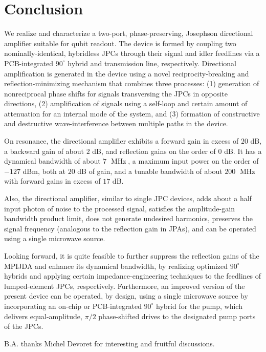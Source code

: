 \documentclass[aip,onecolumn,10pt]{revtex4}%
\begin{document}
\section{Conclusion}

We realize and characterize a two-port, phase-preserving, Josephson directional amplifier suitable for qubit readout. The device is formed by coupling two nominally-identical, hybridless JPCs through their signal and idler feedlines via a PCB-integrated $90^{\circ}$ hybrid and transmission line, respectively. Directional amplification is generated in the device using a novel reciprocity-breaking and reflection-minimizing mechanism that combines three processes: (1) generation of nonreciprocal phase shifts for signals transversing the JPCs in opposite directions, (2) amplification of signals using a self-loop and certain amount of attenuation for an internal mode of the system, and (3) formation of constructive and destructive wave-interference between multiple paths in the device.

On resonance, the directional amplifier exhibits a forward gain in excess of $20$ dB, a backward gain of about $2$ dB, and reflection gains on the order of $0$ dB. It has a dynamical bandwidth of about $7$ $\operatorname{MHz}$, a maximum input power on the order of $-127$ dBm, both at $20$ dB of gain, and a tunable bandwidth of about $200$ $\operatorname{MHz}$ with forward gains in excess of $17$ dB. 

Also, the directional amplifier, similar to single JPC devices, adds about a half input photon of noise to the processed signal, satisfies the amplitude-gain bandwidth product limit, does not generate undesired harmonics, preserves the signal frequency (analogous to the reflection gain in JPAs), and can be operated using a single microwave source.   

Looking forward, it is quite feasible to further suppress the reflection gains of the MPIJDA and enhance its dynamical bandwidth, by realizing optimized $90^{\circ}$ hybrids and applying certain impedance-engineering techniques to the feedlines of lumped-element JPCs, respectively. Furthermore, an improved version of the present device can be operated, by design, using a single microwave source by incorporating an on-chip or PCB-integrated $90^{\circ}$ hybrid for the pump, which delivers equal-amplitude, $\pi/2$ phase-shifted drives to the designated pump ports of the JPCs.

\begin{acknowledgments}
B.A. thanks Michel Devoret for interesting and fruitful discussions.  
\end{acknowledgments}
\end{document}
